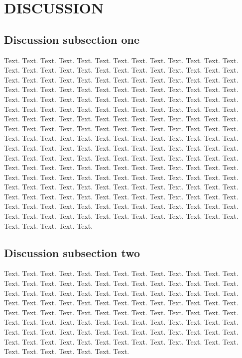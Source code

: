 \documentclass[a4,center,fleqn]{NAR}
\begin{document}
\section{DISCUSSION}

\subsection{Discussion subsection one}

Text. Text. Text. Text. Text. Text. Text. Text. Text. Text. Text.
Text. Text. Text. Text. Text. Text. Text. Text. Text. Text. Text.
Text. Text. Text. Text. Text. Text. Text. Text. Text. Text. Text.
Text. Text. Text. Text. Text. Text. Text. Text. Text. Text. Text.
Text. Text. Text. Text. Text. Text. Text. Text. Text. Text. Text.
Text. Text. Text. Text. Text. Text. Text. Text. Text. Text. Text.
Text. Text. Text. Text. Text. Text. Text. Text. Text. Text. Text.
Text. Text. Text. Text. Text. Text. Text. Text. Text. Text. Text.
Text. Text. Text. Text. Text. Text. Text. Text. Text. Text. Text.
Text. Text. Text. Text. Text. Text. Text. Text. Text. Text. Text.
Text. Text. Text. Text. Text. Text. Text. Text. Text. Text. Text.
Text. Text. Text. Text. Text. Text. Text. Text. Text. Text. Text.
Text. Text. Text. Text. Text. Text. Text. Text. Text. Text. Text.
Text. Text. Text. Text. Text. Text. Text. Text. Text. Text. Text.
Text. Text. Text. Text. Text. Text. Text. Text. Text. Text. Text.
Text. Text. Text. Text. Text. Text. Text. Text. Text. Text. Text.
Text. Text. Text. Text. Text. Text. Text. Text. Text. Text. Text.
Text. Text. Text. Text. Text. Text. Text. Text. Text. Text. Text.
Text. Text. Text. Text. Text. Text. Text. Text. Text. Text. Text.
Text. Text. Text. Text. Text. Text. Text. Text. Text. Text. Text.
Text. Text. Text. Text. Text. Text.


\subsection{Discussion subsection two}

Text. Text. Text. Text. Text. Text. Text. Text. Text. Text. Text.
Text. Text. Text. Text. Text. Text. Text. Text. Text. Text. Text.
Text. Text. Text. Text. Text. Text. Text. Text. Text. Text. Text.
Text. Text. Text. Text. Text. Text. Text. Text. Text. Text. Text.
Text. Text. Text. Text. Text. Text. Text. Text. Text. Text. Text.
Text. Text. Text. Text. Text. Text. Text. Text. Text. Text. Text.
Text. Text. Text. Text. Text. Text. Text. Text. Text. Text. Text.
Text. Text. Text. Text. Text. Text. Text. Text. Text. Text. Text.
Text. Text. Text. Text. Text. Text. Text. Text. Text. Text. Text.
Text. Text. Text. Text. Text. Text. Text. Text. Text. Text. Text.
Text.
\end{document}
